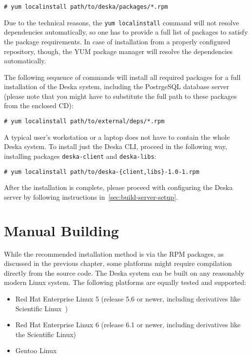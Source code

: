 \documentclass[deska]{subfiles}
\begin{document}
\begin{verbatim}
# yum localinstall path/to/deska/packages/*.rpm
\end{verbatim}

Due to the technical reasons, the {\tt yum localinstall} command will not resolve dependencies automatically, so one has
to provide a full list of packages to satisfy the package requirements.  In case of installation from a properly
configured repository, though, the YUM package manager will resolve the dependencies automatically.

The following sequence of commands will install all required packages for a full installation of the Deska system,
including the PostrgeSQL database server (please note that you might have to substitute the full path to these packages
from the enclosed CD):


\begin{verbatim}
# yum localinstall path/to/external/deps/*.rpm
\end{verbatim}

A typical user's workstation or a laptop does not have to contain the whole Deska system.  To install just the Deska
CLI, proceed in the following way, installing packages {\tt deska-client} and {\tt deska-libs}:

\begin{verbatim}
# yum localinstall path/to/deska-{client,libs}-1.0-1.rpm
\end{verbatim}

After the installation is complete, please proceed with configuring the Deska server by following instructions
in~\ref{sec:build-server-setup}.

\section{Manual Building}

While the recommended installation method is via the RPM packages, as discussed in the previous chapter, some platforms
might require compilation directly from the source code.  The Deska system can be built on any reasonably modern Linux
system.  The following platforms are equally tested and supported:

\begin{itemize}
    \item Red Hat Enterprise Linux \cite{rhel} 5 (release 5.6 or newer, including derivatives like Scientific
        Linux~\cite{scientific-linux})
    \item Red Hat Enterprise Linux 6 (release 6.1 or newer, including derivatives like the Scientific Linux)
    \item Gentoo Linux~\cite{gentoo}
\end{itemize}
\end{document}
